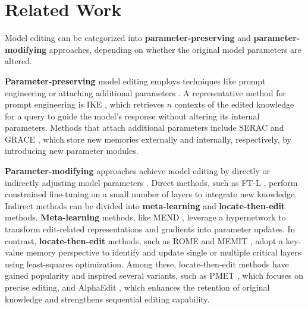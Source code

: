 \section{Related Work}
\label{relatedwork}
Model editing can be categorized into \textbf{parameter-preserving} and \textbf{parameter-modifying} approaches, depending on whether the original model parameters are altered.

\textbf{Parameter-preserving} model editing employs techniques like prompt engineering or attaching additional parameters \cite{zhong2023mquake,li2024sweaupdatingfactualknowledge,huang2023transformer,wang2024wiserethinkingknowledgememory}. A representative method for prompt engineering is IKE \cite{zheng-etal-2023-edit}, which retrieves $n$ contexts of the edited knowledge for a query to guide the model's response without altering its internal parameters. Methods that attach additional parameters include SERAC \cite{mitchell2022memory} and GRACE \cite{hartvigsen2024aging}, which store new memories externally and internally, respectively, by introducing new parameter modules.

\textbf{Parameter-modifying} approaches achieve model editing by directly or indirectly adjusting model parameters \cite{tan2024massiveeditinglargelanguage,deng2024unke}. Direct methods, such as FT-L \cite{zhu2020modifying}, perform constrained fine-tuning on a small number of layers to integrate new knowledge. Indirect methods can be divided into \textbf{meta-learning} and \textbf{locate-then-edit} methods. \textbf{Meta-learning} methods, like MEND \cite{mitchell2022fast}, leverage a hypernetwork to transform edit-related representations and gradients into parameter updates. In contrast, \textbf{locate-then-edit} methods, such as ROME \cite{Meng2022Locating} and MEMIT \cite{meng2022massediting}, adopt a key-value memory perspective to identify and update single or multiple critical layers using least-squares optimization. Among these, locate-then-edit methods have gained popularity and inspired several variants, such as PMET \cite{li2024pmet}, which focuses on precise editing, and AlphaEdit \cite{fang2024alphaedit}, which enhances the retention of original knowledge and strengthens sequential editing capability.